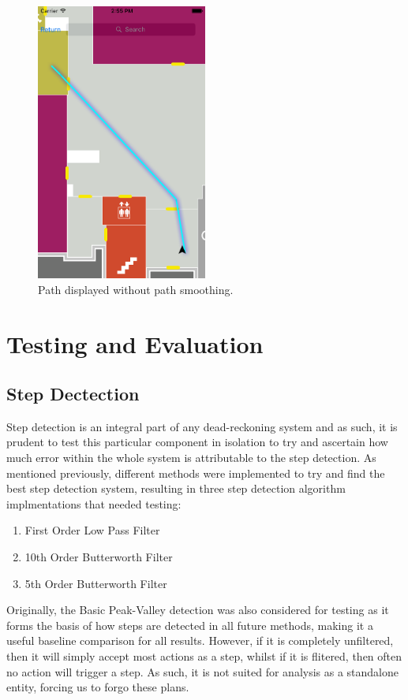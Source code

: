 \documentclass[12pt,a4paper]{report}
\begin{document}
\begin{figure}[]
\center
\includegraphics[width=0.5\textwidth]{images/smoothPath.png}
\caption{Path displayed without path smoothing.}
\label{fig:smoothPath}
\end{figure}


\chapter{Testing and Evaluation}

\section{Step Dectection}
\label{sec:stepTesting}

Step detection is an integral part of any dead-reckoning system and as such, 
it is prudent to test this particular component in isolation to try and ascertain how much error within the whole system is attributable to the step detection.
As mentioned previously, different methods were implemented to try and find the best step detection system, resulting in three step detection algorithm implmentations that needed testing:
\begin{enumerate}
	\item First Order Low Pass Filter
	\item 10th Order Butterworth Filter
	\item 5th Order Butterworth Filter
\end{enumerate}

Originally, the Basic Peak-Valley detection was also considered for testing as it forms the basis of how steps are detected in all future methods, making it a useful baseline comparison for all results. However, if it is completely unfiltered, then it will simply accept most actions as a step, whilst if it is flitered, then often no action will trigger a step. As such, it is not suited for analysis as a standalone entity, forcing us to forgo these plans.
\end{document}
